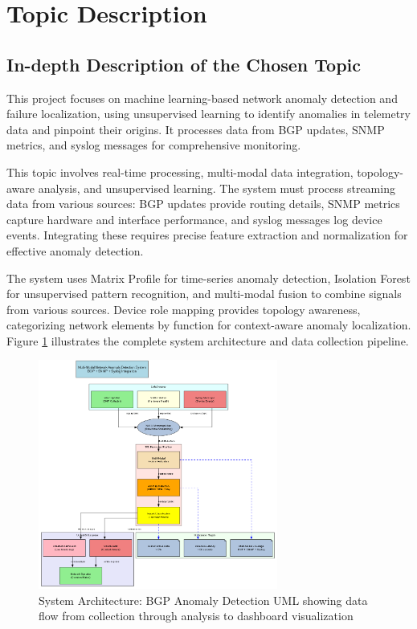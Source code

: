 \documentclass[11pt]{article}
\begin{document}
\section{Topic Description}

\subsection{In-depth Description of the Chosen Topic}

This project focuses on machine learning-based network anomaly detection and failure localization, using unsupervised learning to identify anomalies in telemetry data and pinpoint their origins. It processes data from BGP updates, SNMP metrics, and syslog messages for comprehensive monitoring.

This topic involves real-time processing, multi-modal data integration, topology-aware analysis, and unsupervised learning. The system must process streaming data from various sources: BGP updates provide routing details, SNMP metrics capture hardware and interface performance, and syslog messages log device events. Integrating these requires precise feature extraction and normalization for effective anomaly detection.

The system uses Matrix Profile for time-series anomaly detection, Isolation Forest for unsupervised pattern recognition, and multi-modal fusion to combine signals from various sources. Device role mapping provides topology awareness, categorizing network elements by function for context-aware anomaly localization. Figure \ref{fig:architecture} illustrates the complete system architecture and data collection pipeline.

\begin{figure}[h]
\centering
\includegraphics[width=0.7\textwidth]{system_architecture.png}
\caption{System Architecture: BGP Anomaly Detection UML showing data flow from collection through analysis to dashboard visualization}
\label{fig:architecture}
\end{figure}
\end{document}
